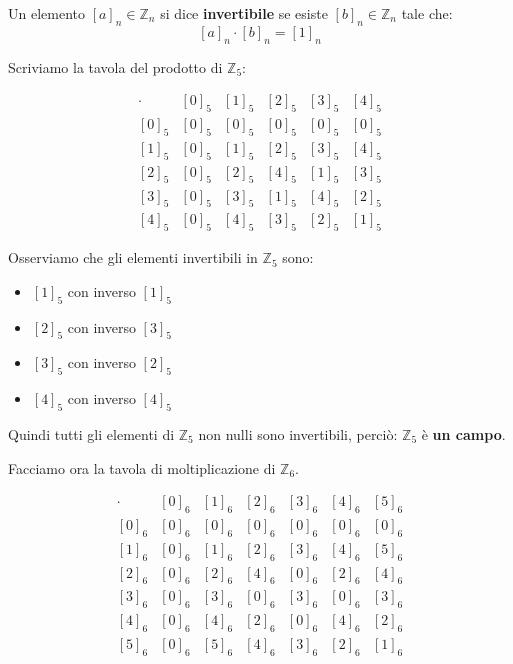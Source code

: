 \documentclass[
  a4paper,
]{article}
\providecommand{\tightlist}{%
  \setlength{\itemsep}{0pt}\setlength{\parskip}{0pt}}
\providecommand{\tightlist}{}
\begin{document}
\begin{definitionbox}
Un elemento \(\left[a\right]_n \in \mathbb{Z}_n\) si dice
\textbf{invertibile} se esiste \([b]_n \in \mathbb{Z}_n\) tale che: \[
\left[a\right]_n \cdot [b]_n = [1]_n
\]
\end{definitionbox}

\begin{examplebox}
Scriviamo la tavola del prodotto di \(\mathbb{Z}_5\):

\[
\begin{array}{c|ccccc}
\cdot & [0]_5 & [1]_5 & [2]_5 & [3]_5 & [4]_5\\
\hline
\left[0\right]_5 & [0]_5 & [0]_5 & [0]_5 & [0]_5 & [0]_5\\
\left[1\right]_5 & [0]_5 & [1]_5 & [2]_5 & [3]_5 & [4]_5\\
\left[2\right]_5 & [0]_5 & [2]_5 & [4]_5 & [1]_5 & [3]_5\\
\left[3\right]_5 & [0]_5 & [3]_5 & [1]_5 & [4]_5 & [2]_5\\
\left[4\right]_5 & [0]_5 & [4]_5 & [3]_5 & [2]_5 & [1]_5
\end{array}
\]

Osserviamo che gli elementi invertibili in \(\mathbb Z_5\) sono:

\begin{itemize}
\tightlist
\item
  \([1]_5\) con inverso \([1]_5\)\\
\item
  \([2]_5\) con inverso \([3]_5\)\\
\item
  \([3]_5\) con inverso \([2]_5\)\\
\item
  \([4]_5\) con inverso \([4]_5\)
\end{itemize}

Quindi tutti gli elementi di \(\mathbb Z_5\) non nulli sono invertibili,
perciò: \(\mathbb{Z}_5\) è \textbf{un campo}.

\bigskip

Facciamo ora la tavola di moltiplicazione di \(\mathbb Z_6\).

\[
\begin{array}{c|cccccc}
\cdot & [0]_6 & [1]_6 & [2]_6 & [3]_6 & [4]_6 & [5]_6\\
\hline
\left[0\right]_6 & [0]_6 & [0]_6 & [0]_6 & [0]_6 & [0]_6 & [0]_6\\
\left[1\right]_6 & [0]_6 & [1]_6 & [2]_6 & [3]_6 & [4]_6 & [5]_6\\
\left[2\right]_6 & [0]_6 & [2]_6 & [4]_6 & [0]_6 & [2]_6 & [4]_6\\
\left[3\right]_6 & [0]_6 & [3]_6 & [0]_6 & [3]_6 & [0]_6 & [3]_6\\
\left[4\right]_6 & [0]_6 & [4]_6 & [2]_6 & [0]_6 & [4]_6 & [2]_6\\
\left[5\right]_6 & [0]_6 & [5]_6 & [4]_6 & [3]_6 & [2]_6 & [1]_6
\end{array}
\]


\end{examplebox}
\end{document}
